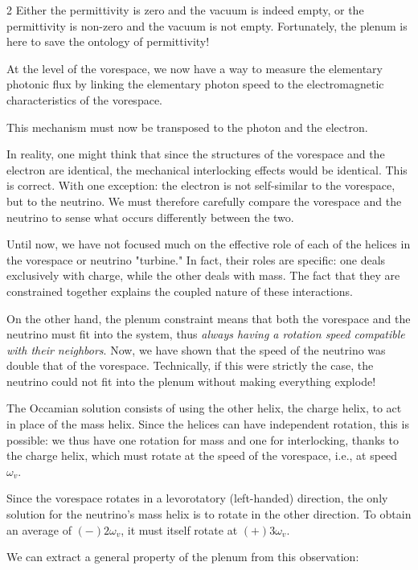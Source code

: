 \begin{multicols}{2}
	Either the permittivity is zero and the vacuum is indeed empty, or the permittivity is non-zero and the vacuum is not empty. Fortunately, the plenum is here to save the ontology of permittivity!
	\medskip
	
	At the level of the vorespace, we now have a way to measure the elementary photonic flux by linking the elementary photon speed to the electromagnetic characteristics of the vorespace.
	
	This mechanism must now be transposed to the photon and the electron.
	
	In reality, one might think that since the structures of the vorespace and the electron are identical, the mechanical interlocking effects would be identical. This is correct. With one exception: the electron is not self-similar to the vorespace, but to the neutrino. We must therefore carefully compare the vorespace and the neutrino to sense what occurs differently between the two.
	
	Until now, we have not focused much on the effective role of each of the helices in the vorespace or neutrino "turbine." In fact, their roles are specific: one deals exclusively with charge, while the other deals with mass. The fact that they are constrained together explains the coupled nature of these interactions.
	
	On the other hand, the plenum constraint means that both the vorespace and the neutrino must fit into the system, thus \textit{always having a rotation speed compatible with their neighbors}. Now, we have shown that the speed of the neutrino was double that of the vorespace. Technically, if this were strictly the case, the neutrino could not fit into the plenum without making everything explode!
	
	The Occamian solution consists of using the other helix, the charge helix, to act in place of the mass helix. Since the helices can have independent rotation, this is possible: we thus have one rotation for mass and one for interlocking, thanks to the charge helix, which must rotate at the speed of the vorespace, i.e., at speed $\omega_v$.
	
	Since the vorespace rotates in a levorotatory (left-handed) direction, the only solution for the neutrino's mass helix is to rotate in the other direction. To obtain an average of $(-)2 \omega_v$, it must itself rotate at $(+) 3 \omega_v$.
	
	We can extract a general property of the plenum from this observation:
	

\end{multicols}
